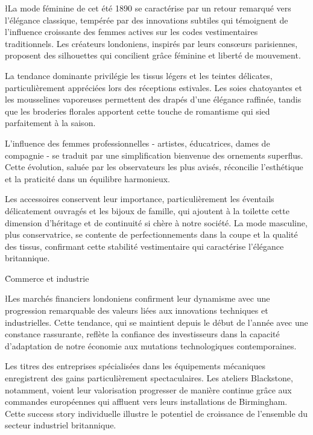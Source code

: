 \documentclass{news}
\begin{document}
\l{L}a mode féminine de cet été 1890 se caractérise par un retour remarqué vers l'élégance classique, tempérée par des innovations subtiles qui témoignent de l'influence croissante des femmes actives sur les codes vestimentaires traditionnels. Les créateurs londoniens, inspirés par leurs consœurs parisiennes, proposent des silhouettes qui concilient grâce féminine et liberté de mouvement.

La tendance dominante privilégie les tissus légers et les teintes délicates, particulièrement appréciées lors des réceptions estivales. Les soies chatoyantes et les mousselines vaporeuses permettent des drapés d'une élégance raffinée, tandis que les broderies florales apportent cette touche de romantisme qui sied parfaitement à la saison.

L'influence des femmes professionnelles - artistes, éducatrices, dames de compagnie - se traduit par une simplification bienvenue des ornements superflus. Cette évolution, saluée par les observateurs les plus avisés, réconcilie l'esthétique et la praticité dans un équilibre harmonieux.

Les accessoires conservent leur importance, particulièrement les éventails délicatement ouvragés et les bijoux de famille, qui ajoutent à la toilette cette dimension d'héritage et de continuité si chère à notre société. La mode masculine, plus conservatrice, se contente de perfectionnements dans la coupe et la qualité des tissus, confirmant cette stabilité vestimentaire qui caractérise l'élégance britannique.

\h{Commerce et industrie}

\l{L}es marchés financiers londoniens confirment leur dynamisme avec une progression remarquable des valeurs liées aux innovations techniques et industrielles. Cette tendance, qui se maintient depuis le début de l'année avec une constance rassurante, reflète la confiance des investisseurs dans la capacité d'adaptation de notre économie aux mutations technologiques contemporaines.

Les titres des entreprises spécialisées dans les équipements mécaniques enregistrent des gains particulièrement spectaculaires. Les ateliers Blackstone, notamment, voient leur valorisation progresser de manière continue grâce aux commandes européennes qui affluent vers leurs installations de Birmingham. Cette success story individuelle illustre le potentiel de croissance de l'ensemble du secteur industriel britannique.
\end{document}
